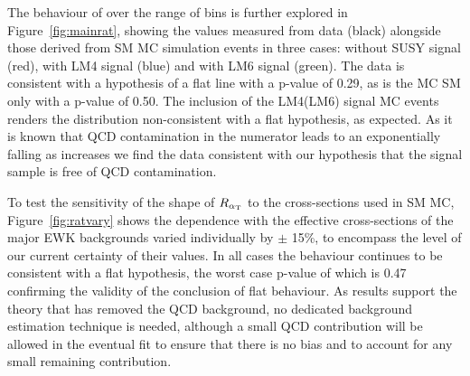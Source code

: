 The behaviour of \RaT over the range of \HT bins is further explored in Figure~\ref{fig:mainrat}, showing the values measured from data (black) alongside those derived from SM MC simulation events in three cases: without SUSY signal (red), with LM4 signal (blue) and with LM6 signal (green). The data is consistent with a hypothesis of a flat line with a p-value of 0.29, as is the MC SM only with a p-value of 0.50. The inclusion of the LM4(LM6) signal MC events renders the distribution non-consistent with a flat hypothesis, as expected. As it is known that QCD contamination in the numerator leads to an exponentially falling \RaT as \HT increases we find the data consistent with our hypothesis that the signal sample is free of QCD contamination.

To test the sensitivity of the shape of $R_{\alpha_{\text{T}}}$ to the cross-sections used in SM MC, Figure~\ref{fig:ratvary} shows the \HT dependence with the effective cross-sections of the major EWK backgrounds varied individually by $\pm$ 15\%, to encompass the level of our current certainty of their values. In all cases the behaviour continues to be consistent with a flat hypothesis, the worst case p-value of which is 0.47 confirming the validity of the conclusion of flat behaviour. As results support the theory that \alt has removed the QCD background, no dedicated background estimation technique is needed, although a small QCD contribution will be allowed in the eventual fit to ensure that there is no bias and to account for any small remaining contribution. 

